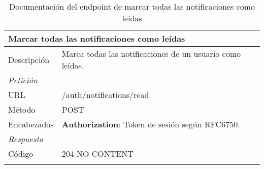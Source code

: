 \vspace{-28pt}
\begin{longtable}{|p{} p{}|}
    \hline
    \multicolumn{2}{|l|}{\textbf{Marcar todas las notificaciones como leídas}} \\ \hline 
    Descripción         & Marca todas las notificaciones de un usuario como leídas. \\ \hline \hline
    \multicolumn{2}{|l|}{\emph{Petición}}  \\ \hline 
    URL      & /auth/notifications/read \\ \hline
    Método   & POST                  \\ \hline
    Encabezados  & 
    \textbf{Authorization}: Token de sesión según RFC6750. \\ \hline \hline
    \multicolumn{2}{|l|}{\emph{Respuesta}} \\ \hline 
    Código          & 204 NO CONTENT          \\ \hline 
    \caption{Documentación del endpoint de marcar todas las notificaciones como leídas}
    \label{api:leer_notificaciones_todas}
\end{longtable}

\vspace{-38pt}